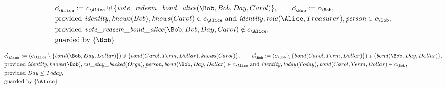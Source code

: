 \begin{align*}
&
c'_
{
\Alice
}
 := 
c_
{
\Alice
}
 \uplus 
\{
\mathit{\detokenize{
vote_redeem_bond_alice
}}
(
\Bob
,
Bob
,
Day
,
Carol
)
\}
, \qquad 
c'_
{
\Bob
}
 := 
c_
{
\Bob
}
,\\
&
\text{provided } 
\mathit{\detokenize{
identity
}}
,
\mathit{\detokenize{
knows
}}
(
Bob
)
,
\mathit{\detokenize{
knows
}}
(
Carol
)
 \in c_
{
\Alice
}
 \text{ and } 
\mathit{\detokenize{
identity
}}
,
\mathit{\detokenize{
role
}}
(
\Alice
,
Treasurer
)
,
\mathit{\detokenize{
person
}}
 \in c_
{
\Bob
}
,\\
&
\text{provided } 
\mathit{\detokenize{
vote_redeem_bond_alice
}}
(
\Bob
,
Bob
,
Day
,
Carol
)
 \notin c_
{
\Alice
}
,\\
&
\text{guarded by } \{
\Bob
\}
\end{align*}

\begin{align*}
&
c'_
{
\Alice
}
 := 
(c_
{
\Alice
}
 \setminus 
\{
\mathit{\detokenize{
bond
}}
(
\Bob
,
Day
,
Dollar
)
\}
) \uplus 
\{
\mathit{\detokenize{
bond
}}
(
Carol
,
Term
,
Dollar
)
,
\mathit{\detokenize{
knows
}}
(
Carol
)
\}
, \qquad 
c'_
{
\Bob
}
 := 
(c_
{
\Bob
}
 \setminus 
\{
\mathit{\detokenize{
bond
}}
(
Carol
,
Term
,
Dollar
)
\}
) \uplus 
\{
\mathit{\detokenize{
bond
}}
(
\Bob
,
Day
,
Dollar
)
\}
,\\
&
\text{provided } 
\mathit{\detokenize{
identity
}}
,
\mathit{\detokenize{
knows
}}
(
\Bob
)
,
\mathit{\detokenize{
all_stay_backed
}}
(
Orga
)
,
\mathit{\detokenize{
person
}}
,
\mathit{\detokenize{
bond
}}
(
\Bob
,
Day
,
Dollar
)
 \in c_
{
\Alice
}
 \text{ and } 
\mathit{\detokenize{
identity
}}
,
\mathit{\detokenize{
today
}}
(
Today
)
,
\mathit{\detokenize{
bond
}}
(
Carol
,
Term
,
Dollar
)
 \in c_
{
\Bob
}
,\\
&
\text{provided } 
Day
\le
Today
,\\
&
\text{guarded by } \{
\Alice
\}
\end{align*}

